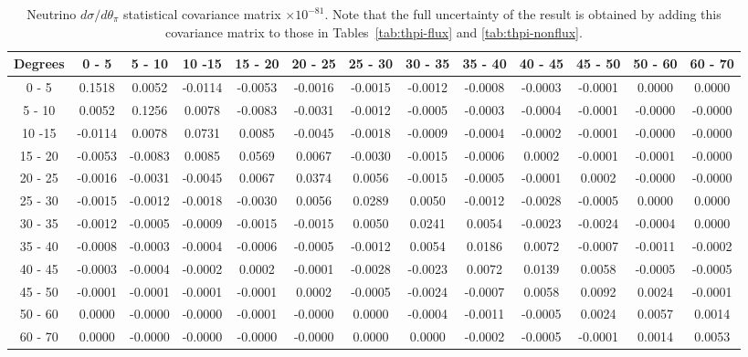\documentclass[aps,prl,twocolumn,showpacs,superscriptaddress,nofootinbib]{revtex4}
\begin{document}
\begingroup
\squeezetable
\begin{table}[h]
\tabcolsep=0.11cm
\begin{tabular}{c|cccccccccccc}
Degrees & 0 - 5 & 5 - 10 & 10 -15 & 15 - 20 & 20 - 25 & 25 - 30 & 30 - 35 & 35 - 40 & 40 - 45 & 45 - 50 & 50 - 60 & 60 - 70 \\
\hline
 0 - 5& 0.1518 & 0.0052 & -0.0114 & -0.0053 & -0.0016 & -0.0015 & -0.0012 & -0.0008 & -0.0003 & -0.0001 & 0.0000 & 0.0000  \\
5 - 10 &0.0052 & 0.1256 & 0.0078 & -0.0083 & -0.0031 & -0.0012 & -0.0005 & -0.0003 & -0.0004 & -0.0001 & -0.0000 & -0.0000  \\
10 -15 &-0.0114 & 0.0078 & 0.0731 & 0.0085 & -0.0045 & -0.0018 & -0.0009 & -0.0004 & -0.0002 & -0.0001 & -0.0000 & -0.0000  \\
15 - 20  &-0.0053 & -0.0083 & 0.0085 & 0.0569 & 0.0067 & -0.0030 & -0.0015 & -0.0006 & 0.0002 & -0.0001 & -0.0001 & -0.0000  \\
20 - 25 &-0.0016 & -0.0031 & -0.0045 & 0.0067 & 0.0374 & 0.0056 & -0.0015 & -0.0005 & -0.0001 & 0.0002 & -0.0000 & -0.0000  \\
25 - 30 &-0.0015 & -0.0012 & -0.0018 & -0.0030 & 0.0056 & 0.0289 & 0.0050 & -0.0012 & -0.0028 & -0.0005 & 0.0000 & 0.0000  \\
30 - 35 &-0.0012 & -0.0005 & -0.0009 & -0.0015 & -0.0015 & 0.0050 & 0.0241 & 0.0054 & -0.0023 & -0.0024 & -0.0004 & 0.0000  \\
35 - 40 &-0.0008 & -0.0003 & -0.0004 & -0.0006 & -0.0005 & -0.0012 & 0.0054 & 0.0186 & 0.0072 & -0.0007 & -0.0011 & -0.0002  \\
40 - 45 &-0.0003 & -0.0004 & -0.0002 & 0.0002 & -0.0001 & -0.0028 & -0.0023 & 0.0072 & 0.0139 & 0.0058 & -0.0005 & -0.0005  \\
45 - 50 &-0.0001 & -0.0001 & -0.0001 & -0.0001 & 0.0002 & -0.0005 & -0.0024 & -0.0007 & 0.0058 & 0.0092 & 0.0024 & -0.0001  \\
50 - 60 &0.0000 & -0.0000 & -0.0000 & -0.0001 & -0.0000 & 0.0000 & -0.0004 & -0.0011 & -0.0005 & 0.0024 & 0.0057 & 0.0014  \\
60 - 70 &0.0000 & -0.0000 & -0.0000 & -0.0000 & -0.0000 & 0.0000 & 0.0000 & -0.0002 & -0.0005 & -0.0001 & 0.0014 & 0.0053  \\
 
\end{tabular}
\caption{Neutrino $d\sigma/d\theta_\pi$ statistical covariance matrix  $\times 10^{-81}$.  Note that the full uncertainty of the result is obtained by adding this covariance matrix to those in Tables~\ref{tab:thpi-flux} and \ref{tab:thpi-nonflux}. }
\end{table}
\endgroup
\end{document}
